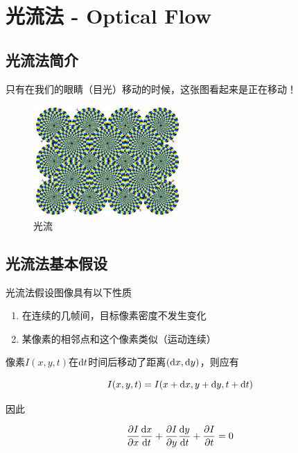 \section{光流法 - Optical Flow}


\subsection{光流法简介}

只有在我们的眼睛（目光）移动的时候，这张图看起来是正在移动！

\begin{figure}
    \centering
    \includegraphics[width=0.5\textwidth]{images/optical_flow_human.jpg}
    \caption{光流}
\end{figure}



\subsection{光流法基本假设}

光流法假设图像具有以下性质

\begin{enumerate}
    \item 在连续的几帧间，目标像素密度不发生变化
    \item 某像素的相邻点和这个像素类似（运动连续）
\end{enumerate}

像素$I(x, y, t)$在$\mathrm{d} t$时间后移动了距离$(\mathrm{d} x, \mathrm{d} y)$，则应有


\begin{equation}
    I(x, y, t) = I(x + \mathrm{d} x, y + \mathrm{d} y, t + \mathrm{d} t)
\end{equation}

因此

\begin{equation}
    \label{eq:optical_flow_eq}
    \frac{\partial I}{\partial x} \frac{\mathrm{d} x}{\mathrm{d} t} + \frac{\partial I}{\partial y} \frac{\mathrm{d} y}{\mathrm{d} t} + \frac{\partial I}{\partial t} = 0
\end{equation}

